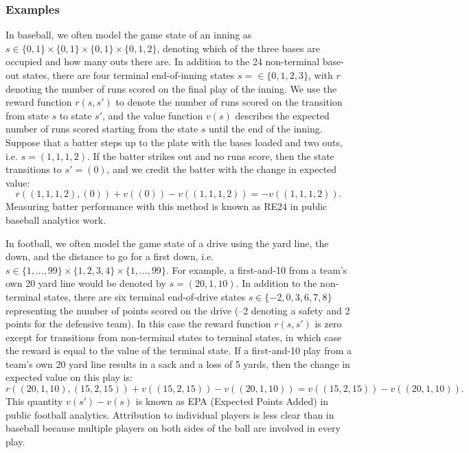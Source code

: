 \documentclass{article}
\begin{document}
      \subsubsection{\sc Examples}

        In baseball, we often model the game state of an inning as $s \in \{0, 1\} \times \{0, 1\} \times \{0, 1\} \times \{0, 1, 2\}$, denoting which of the three bases are occupied and how many outs there are. In addition to the 24 non-terminal base-out states, there are four terminal end-of-inning states $s = \in \{0, 1, 2, 3\}$, with $r$ denoting the number of runs scored on the final play of the inning. We use the reward function $r(s, s')$ to denote the number of runs scored on the transition from state $s$ to state $s'$, and the value function $v(s)$ describes the expected number of runs scored starting from the state $s$ until the end of the inning. Suppose that a batter steps up to the plate with the bases loaded and two outs, i.e. $s = (1, 1, 1, 2)$. If the batter strikes out and no runs score, then the state transitions to $s' = (0)$, and we credit the batter with the change in expected value:
        $$
          r((1, 1, 1, 2), (0)) + v((0)) - v((1, 1, 1, 2)) = -v((1, 1, 1, 2)).
        $$
        Measuring batter performance with this method is known as RE24 in public baseball analytics work.

        In football, we often model the game state of a drive using the yard line, the down, and the distance to go for a first down, i.e. $s \in \{1, ..., 99\} \times \{1, 2, 3, 4\} \times \{1, ..., 99\}$. For example, a first-and-10 from a team's own 20 yard line would be denoted by $s = (20, 1, 10)$. In addition to the non-terminal states, there are six terminal end-of-drive states $s \in \{-2, 0, 3, 6, 7, 8\}$ representing the number of points scored on the drive (--2 denoting a safety and 2 points for the defensive team). In this case the reward function $r(s, s')$ is zero except for transitions from non-terminal states to terminal states, in which case the reward is equal to the value of the terminal state. If a first-and-10 play from a team's own 20 yard line results in a sack and a loss of 5 yards, then the change in expected value on this play is:
        $$
          r((20, 1, 10), (15, 2, 15)) + v((15, 2, 15)) - v((20, 1, 10)) = v((15, 2, 15)) - v((20, 1, 10)).
        $$
        This quantity $v(s') - v(s)$ is known as EPA (Expected Points Added) in public football analytics. Attribution to individual players is less clear than in baseball because multiple players on both sides of the ball are involved in every play.
\end{document}
